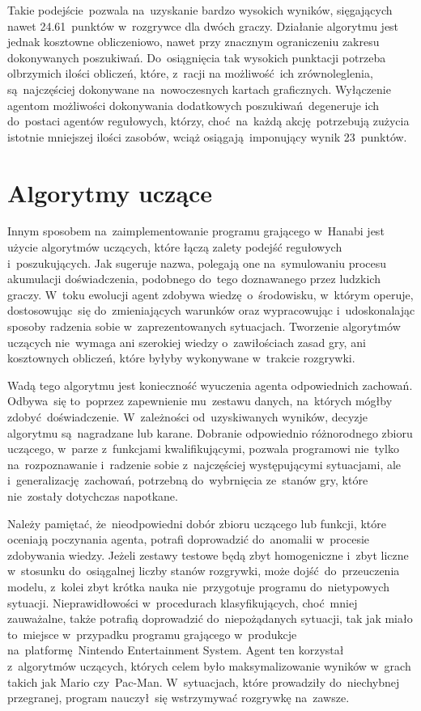 \documentclass[declaration,shortabstract,inz]{iithesis}
\begin{document}
Takie podejście pozwala na~uzyskanie bardzo wysokich wyników, sięgających nawet 24.61~punktów w~rozgrywce dla dwóch graczy. Działanie algorytmu jest jednak kosztowne obliczeniowo, nawet przy znacznym ograniczeniu zakresu dokonywanych poszukiwań. Do~osiągnięcia tak wysokich punktacji potrzeba olbrzymich ilości obliczeń, które, z~racji na możliwość ich zrównoleglenia, są~najczęściej dokonywane na~nowoczesnych kartach graficznych. Wyłączenie agentom możliwości dokonywania dodatkowych poszukiwań degeneruje ich do~postaci agentów regułowych, którzy, choć na~każdą akcję potrzebują zużycia istotnie mniejszej ilości zasobów, wciąż osiągają imponujący wynik 23~punktów.

\section{Algorytmy uczące}

Innym sposobem na~zaimplementowanie programu grającego w~Hanabi jest użycie algorytmów uczących, które łączą zalety podejść regułowych i~poszukujących. Jak sugeruje nazwa, polegają one na~symulowaniu procesu akumulacji doświadczenia, podobnego do~tego doznawanego przez ludzkich graczy. W~toku ewolucji agent zdobywa wiedzę o~środowisku, w~którym operuje, dostosowując~się do~zmieniających warunków oraz wypracowując i~udoskonalając sposoby radzenia sobie w~zaprezentowanych sytuacjach. Tworzenie algorytmów uczących nie~wymaga ani szerokiej wiedzy o~zawiłościach zasad gry, ani kosztownych obliczeń, które byłyby wykonywane w~trakcie rozgrywki.

Wadą tego algorytmu jest konieczność wyuczenia agenta odpowiednich zachowań. Odbywa~się to~poprzez zapewnienie mu~zestawu danych, na~których mógłby zdobyć doświadczenie. W~zależności od~uzyskiwanych wyników, decyzje algorytmu są~nagradzane lub karane. Dobranie odpowiednio różnorodnego zbioru uczącego, w~parze z~funkcjami kwalifikującymi, pozwala programowi nie~tylko na~rozpoznawanie i~radzenie sobie z~najczęściej występującymi sytuacjami, ale i~generalizację zachowań, potrzebną do~wybrnięcia ze~stanów gry, które nie~zostały dotychczas napotkane.

Należy pamiętać, że~nieodpowiedni dobór zbioru uczącego lub funkcji, które oceniają poczynania agenta, potrafi doprowadzić do~anomalii w~procesie zdobywania wiedzy. Jeżeli zestawy testowe będą zbyt homogeniczne i~zbyt liczne w~stosunku do~osiągalnej liczby stanów rozgrywki, może dojść do~przeuczenia modelu, z~kolei zbyt krótka nauka nie~przygotuje programu do~nietypowych sytuacji. Nieprawidłowości w~procedurach klasyfikujących, choć mniej zauważalne, także potrafią doprowadzić do~niepożądanych sytuacji, tak jak miało to~miejsce w~przypadku programu grającego w~produkcje na~platformę Nintendo Entertainment System. Agent ten korzystał z~algorytmów uczących, których celem było maksymalizowanie wyników w~grach takich jak Mario czy~Pac-Man. W~sytuacjach, które prowadziły do~niechybnej przegranej, program nauczył~się wstrzymywać rozgrywkę na~zawsze\cite{Mario}.
\end{document}
